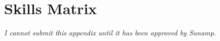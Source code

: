 \chapter{Skills Matrix} %

\label{App:matrix} %


\emph{I cannot submit this appendix until it has been approved by Sunamp.}


